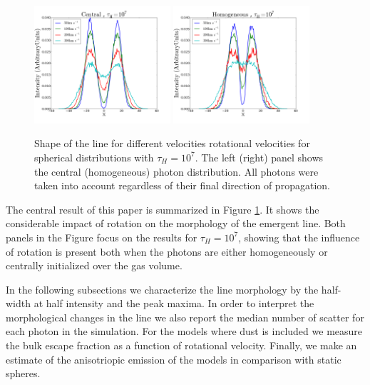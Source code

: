 \documentclass[usenatbib]{mn2e}
\newcommand{\ly}{{\ifmmode{{\rm Ly}\alpha~}\else{Ly$\alpha$~}\fi}}
\begin{document}
\begin{figure}
  \includegraphics[width=0.45\textwidth]{SpectraDifVelocitiesCentral.png}
  \includegraphics[width=0.45\textwidth]{SpectraDifVelocitiesHOM.png}
\caption{Shape of the \ly line for
    different velocities rotational velocities for spherical
    distributions with $\tau_{H}=10^{7}$. The left (right) panel shows
    the central (homogeneous) photon distribution. All photons were
    taken into  account regardless of their final direction of propagation.
    \label{fig:differentvelocities}}  
\end{figure}

The central result of this paper is summarized in Figure
\ref{fig:differentvelocities}. It shows the considerable
impact of rotation on the morphology of the emergent \ly line. Both
panels in the Figure focus on the results for $\tau_{H}=10^{7}$,
showing that the influence of rotation is present both when the
photons are either homogeneously or centrally initialized over the gas
volume. 

In the following subsections we characterize the line morphology by
the half-width at half intensity and the peak maxima. In order to
interpret the morphological changes in the line we also report the
median number of scatter for each \ly photon in the
simulation. For the models where dust is included we measure the bulk
escape fraction as a function of rotational velocity. Finally, we make
an estimate of the anisotriopic emission of the models in comparison
with static spheres.
\end{document}
